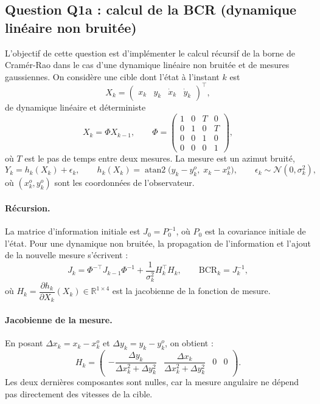 \documentclass[11pt,a4paper]{article}
\newcommand{\N}{\mathcal{N}}
\newcommand{\BCR}{\mathrm{BCR}}
\DeclareMathOperator{\atantwo}{atan2}
\theoremstyle{remark}
\begin{document}
\subsection{Question Q1a : calcul de la BCR (dynamique linéaire non bruitée)}

L'objectif de cette question est d'implémenter le calcul récursif de la borne de Cramér-Rao dans le cas d'une dynamique linéaire non bruitée et de mesures gaussiennes. On considère une cible dont l'état à l'instant $k$ est
\begin{equation}
X_k = \begin{pmatrix} x_k & y_k & \dot{x}_k & \dot{y}_k \end{pmatrix}^{\top},
\end{equation}
de dynamique linéaire et déterministe
\begin{equation}
X_k = \Phi X_{k-1}, \qquad
\Phi = \begin{pmatrix}
1 & 0 & T & 0\\
0 & 1 & 0 & T\\
0 & 0 & 1 & 0\\
0 & 0 & 0 & 1
\end{pmatrix},
\end{equation}
où $T$ est le pas de temps entre deux mesures. La mesure est un azimut bruité,
\begin{equation}
Y_k = h_k(X_k) + \epsilon_k, \qquad
h_k(X_k) = \atantwo\big(y_k - y_k^o,\; x_k - x_k^o\big), \qquad
\epsilon_k \sim \N(0, \sigma_k^2),
\end{equation}
où $(x_k^o, y_k^o)$ sont les coordonnées de l'observateur.

\paragraph{Récursion.}
La matrice d'information initiale est $J_0 = P_0^{-1}$, où $P_0$ est la covariance initiale de l'état. Pour une dynamique non bruitée, la propagation de l'information et l'ajout de la nouvelle mesure s'écrivent :
\begin{equation}
\boxed{\;
J_k = \Phi^{-\top} J_{k-1} \Phi^{-1} + \frac{1}{\sigma_k^2} H_k^\top H_k,
\qquad \BCR_k = J_k^{-1},
\;}
\label{eq:bcr_det}
\end{equation}
où $H_k = \dfrac{\partial h_k}{\partial X_k}(X_k) \in \mathbb{R}^{1\times4}$ est la jacobienne de la fonction de mesure.

\paragraph{Jacobienne de la mesure.}
En posant $\Delta x_k = x_k - x_k^o$ et $\Delta y_k = y_k - y_k^o$, on obtient :
\begin{equation}
H_k = \begin{pmatrix}
-\dfrac{\Delta y_k}{\Delta x_k^2 + \Delta y_k^2} &
\dfrac{\Delta x_k}{\Delta x_k^2 + \Delta y_k^2} &
0 & 0
\end{pmatrix}.
\end{equation}
Les deux dernières composantes sont nulles, car la mesure angulaire ne dépend pas directement des vitesses de la cible.
\end{document}

